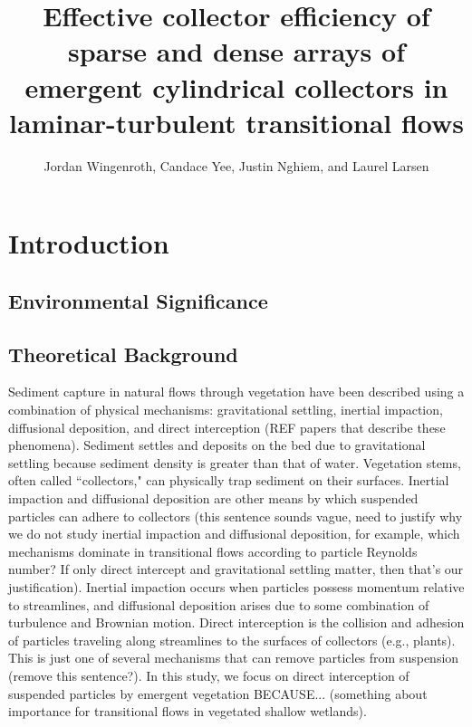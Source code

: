 \documentclass{scrreprt}
\author{Jordan Wingenroth, Candace Yee, Justin Nghiem, and Laurel Larsen}
\title{Effective collector efficiency of sparse and dense arrays of emergent cylindrical collectors in laminar-turbulent transitional flows}
\begin{document}
\maketitle

\chapter{Introduction}

\section{Environmental Significance}

\section{Theoretical Background}

Sediment capture in natural flows through vegetation have been described using a combination of physical mechanisms: gravitational settling, inertial impaction, diffusional deposition, and direct interception (REF papers that describe these phenomena). Sediment settles and deposits on the bed due to gravitational settling because sediment density is greater than that of water. Vegetation stems, often called ``collectors," can physically trap sediment on their surfaces. Inertial impaction and diffusional deposition are other means by which suspended particles can adhere to collectors (this sentence sounds vague, need to justify why we do not study inertial impaction and diffusional deposition, for example, which mechanisms dominate in transitional flows according to particle Reynolds number? If only direct intercept and gravitational settling matter, then that's our justification). Inertial impaction occurs when particles possess momentum relative to streamlines, and diffusional deposition arises due to some combination of turbulence and Brownian motion. Direct interception is the collision and adhesion of particles traveling along streamlines to the surfaces of collectors (e.g., plants). This is just one of several mechanisms that can remove particles from suspension (remove this sentence?). In this study, we focus on direct interception of suspended particles by emergent vegetation BECAUSE... (something about importance for transitional flows in vegetated shallow wetlands).
\end{document}
